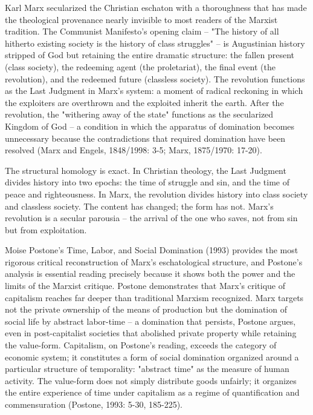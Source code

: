 Karl Marx secularized the Christian eschaton with a thoroughness that has made the theological provenance nearly invisible to most readers of the Marxist tradition. The Communist Manifesto's opening claim -- "The history of all hitherto existing society is the history of class struggles" -- is Augustinian history stripped of God but retaining the entire dramatic structure: the fallen present (class society), the redeeming agent (the proletariat), the final event (the revolution), and the redeemed future (classless society). The revolution functions as the Last Judgment in Marx's system: a moment of radical reckoning in which the exploiters are overthrown and the exploited inherit the earth. After the revolution, the "withering away of the state" functions as the secularized Kingdom of God -- a condition in which the apparatus of domination becomes unnecessary because the contradictions that required domination have been resolved (Marx and Engels, 1848/1998: 3-5; Marx, 1875/1970: 17-20).

The structural homology is exact. In Christian theology, the Last Judgment divides history into two epochs: the time of struggle and sin, and the time of peace and righteousness. In Marx, the revolution divides history into class society and classless society. The content has changed; the form has not. Marx's revolution is a secular parousia -- the arrival of the one who saves, not from sin but from exploitation.

Moise Postone's Time, Labor, and Social Domination (1993) provides the most rigorous critical reconstruction of Marx's eschatological structure, and Postone's analysis is essential reading precisely because it shows both the power and the limits of the Marxist critique. Postone demonstrates that Marx's critique of capitalism reaches far deeper than traditional Marxism recognized. Marx targets not the private ownership of the means of production but the domination of social life by abstract labor-time -- a domination that persists, Postone argues, even in post-capitalist societies that abolished private property while retaining the value-form. Capitalism, on Postone's reading, exceeds the category of economic system; it constitutes a form of social domination organized around a particular structure of temporality: "abstract time" as the measure of human activity. The value-form does not simply distribute goods unfairly; it organizes the entire experience of time under capitalism as a regime of quantification and commensuration (Postone, 1993: 5-30, 185-225).


